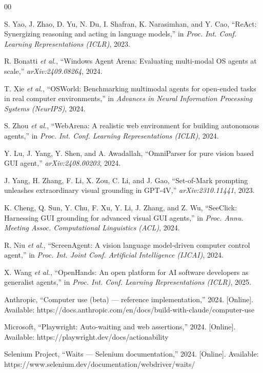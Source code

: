 \documentclass[conference]{IEEEtran}
\newcommand{\todo}[1]{\textcolor{red}{\textbf{[TODO: #1]}}}
\begin{document}
\begin{thebibliography}{00}


 S. Yao, J. Zhao, D. Yu, N. Du, I. Shafran, K. Narasimhan, and
Y. Cao, ``ReAct: Synergizing reasoning and acting in language models,'' in
\emph{Proc. Int. Conf. Learning Representations (ICLR)}, 2023.

 R. Bonatti \emph{et al.}, ``Windows Agent Arena: Evaluating
multi-modal OS agents at scale,'' \emph{arXiv:2409.08264}, 2024.

 T. Xie \emph{et al.}, ``OSWorld: Benchmarking multimodal agents
for open-ended tasks in real computer environments,'' in \emph{Advances in Neural
Information Processing Systems (NeurIPS)}, 2024.

 S. Zhou \emph{et al.}, ``WebArena: A realistic web environment
for building autonomous agents,'' in \emph{Proc. Int. Conf. Learning
Representations (ICLR)}, 2024.

 Y. Lu, J. Yang, Y. Shen, and A. Awadallah, ``OmniParser for
pure vision based GUI agent,'' \emph{arXiv:2408.00203}, 2024.

 J. Yang, H. Zhang, F. Li, X. Zou, C. Li, and J. Gao, ``Set-of-Mark
prompting unleashes extraordinary visual grounding in GPT-4V,''
\emph{arXiv:2310.11441}, 2023.

 K. Cheng, Q. Sun, Y. Chu, F. Xu, Y. Li, J. Zhang, and Z. Wu,
``SeeClick: Harnessing GUI grounding for advanced visual GUI agents,'' in
\emph{Proc. Annu. Meeting Assoc. Computational Linguistics (ACL)}, 2024.

 R. Niu \emph{et al.}, ``ScreenAgent: A vision language
model-driven computer control agent,'' in \emph{Proc. Int. Joint Conf. Artificial
Intelligence (IJCAI)}, 2024.

 X. Wang \emph{et al.}, ``OpenHands: An open platform for AI
software developers as generalist agents,'' in \emph{Proc. Int. Conf. Learning
Representations (ICLR)}, 2025.

 Anthropic, ``Computer use (beta) --- reference
implementation,'' 2024. [Online]. Available:
https://docs.anthropic.com/en/docs/build-with-claude/computer-use

 Microsoft, ``Playwright: Auto-waiting and web assertions,''
2024. [Online]. Available: https://playwright.dev/docs/actionability

 Selenium Project, ``Waits --- Selenium documentation,'' 2024.
[Online]. Available: https://www.selenium.dev/documentation/webdriver/waits/

\end{thebibliography}
\end{document}
